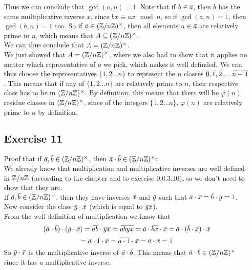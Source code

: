 \documentclass[12pt]{article}
\begin{document}
    Thus we can conclude that $\gcd(a, n) = 1$.
    Note that if $b \in \,\overline{\!{a}}$,
    then $b$ has the same multiplicative inverse $x$,
    since $bx \equiv ax \mod n$,
    so if $\gcd(a, n) = 1$, then $\gcd(b, n) = 1$ too.
    So if $\,\overline{\!{a}} \in (\mathbb{Z}/n\mathbb{Z})^\times$,
    then all elements $a \in \,\overline{\!{a}}$
    are relatively prime to $n$,
    which means that $A \subseteq (\mathbb{Z}/n\mathbb{Z})^\times$. \\
    We can thus conclude that $A = (\mathbb{Z}/n\mathbb{Z})^\times$. \\
    We just showed that $A = (\mathbb{Z}/n\mathbb{Z})^\times$,
    where we also had to show that it applies
    no matter which representative of $a$ we pick,
    which makes it well definded.
    We can thus choose the representatives
    $\{1, 2 \dots n \}$
    to represent
    the $n$ classes $\,\overline{\!{0}}, \,\overline{\!{1}}, \,\overline{\!{2}} \dots \,\overline{\!{n-1}}$.
    This means that if any of $\{1, 2 \dots n \}$
    are relatively prime to $n$,
    their respective class has to be in $(\mathbb{Z}/n\mathbb{Z})^\times$.
    By definition,
    this means that there will be $\varphi(n)$
    residue classes in $(\mathbb{Z}/n\mathbb{Z})^\times$,
    since of the integers $\{1, 2 \dots n \}$,
    $\varphi(n)$ are relatively prime to $n$ by definition. \\

    \subsection*{Exercise 11}
    Proof that if $\,\overline{\!{a}}, \,\overline{\!{b}} \in (\mathbb{Z}/n\mathbb{Z})^\times$,
    then $\,\overline{\!{a}} \cdot \,\overline{\!{b}} \in (\mathbb{Z}/n\mathbb{Z})^\times$: \\
    We already know that multiplication
    and multiplicative inverses are well defined in $\mathbb{Z}/n\mathbb{Z}$
    (according to the chapter and to exercise 0.0.3.10),
    so we don't need to show that they are. \\
    If $\,\overline{\!{a}}, \,\overline{\!{b}} \in (\mathbb{Z}/n\mathbb{Z})^\times$,
    then they have inverses $\,\overline{\!{x}}$ and $\,\overline{\!{y}}$
    such that $\,\overline{\!{a}} \cdot \,\overline{\!{x}} = \,\overline{\!{b}} \cdot \,\overline{\!{y}} = 1$.
    Now consider the class $\,\overline{\!{y}} \cdot \,\overline{\!{x}}$
    (which is equal to $\,\overline{\!{yx}}$). \\
    From the well definition of multiplication we know that
    \[ (\olsi{a} \cdot \olsi{b}) \cdot (\olsi{y} \cdot \olsi{x})
    = \olsi{ab} \cdot \olsi{yx}
    = \olsi{abyx}
    = \olsi{a} \cdot \olsi{bx} \cdot \olsi{x}
    = \olsi{a} \cdot (\olsi{b} \cdot \olsi{x}) \cdot \olsi{x} \]
    \[ = \olsi{a} \cdot \olsi{1} \cdot \olsi{x}
    = \olsi{a \cdot 1} \cdot \olsi{x}
    = \olsi{a} \cdot \olsi{x}
    = \olsi{1} \]
    So $\,\overline{\!{y}} \cdot \,\overline{\!{x}}$
    is the multiplicative inverse of $\,\overline{\!{a}} \cdot \,\overline{\!{b}}$.
    This means that $\,\overline{\!{a}} \cdot \,\overline{\!{b}} \in (\mathbb{Z}/n\mathbb{Z})^\times$
    since it has a multiplicative inverse. \\
\end{document}
